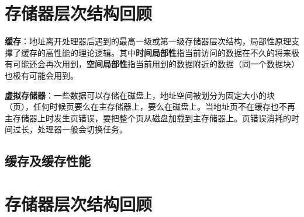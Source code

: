 
\chapter{存储器层次结构回顾}

\textbf{缓存}：地址离开处理器后遇到的最高一级或第一级存储器层次结构，局部性原理支撑了缓存的高性能的理论逻辑。其中\textbf{时间局部性}指当前访问的数据在不久的将来极有可能还会再次用到，\textbf{空间局部性}指当前用到的数据附近的数据（同一个数据块）也极有可能会用到。

\textbf{虚拟存储器}：一些数据可以存储在磁盘上，地址空间被划分为固定大小的块（页），任何时候页要么在主存储器上，要么在磁盘上。当地址页不在缓存也不再主存储器上时发生页错误，要把整个页从磁盘加载到主存储器上。页错误消耗的时间过长，处理器一般会切换任务。
\section{缓存及缓存性能}

\chapter{存储器层次结构回顾}




